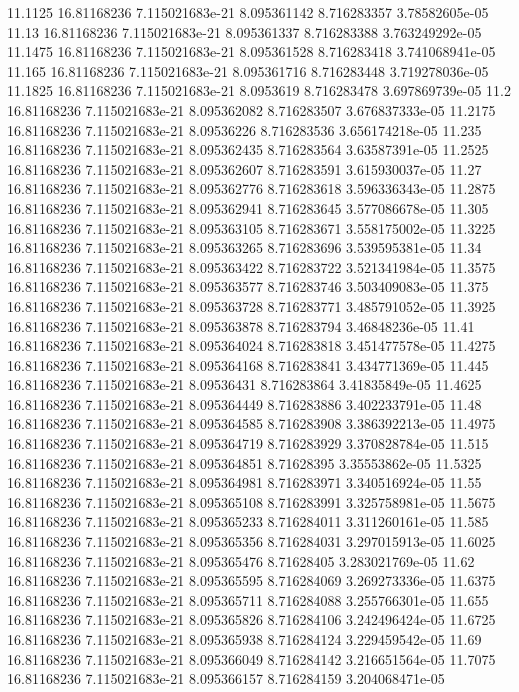{11.1125 16.81168236 7.115021683e-21 8.095361142 8.716283357 3.78582605e-05
11.13 16.81168236 7.115021683e-21 8.095361337 8.716283388 3.763249292e-05
11.1475 16.81168236 7.115021683e-21 8.095361528 8.716283418 3.741068941e-05
11.165 16.81168236 7.115021683e-21 8.095361716 8.716283448 3.719278036e-05
11.1825 16.81168236 7.115021683e-21 8.0953619 8.716283478 3.697869739e-05
11.2 16.81168236 7.115021683e-21 8.095362082 8.716283507 3.676837333e-05
11.2175 16.81168236 7.115021683e-21 8.09536226 8.716283536 3.656174218e-05
11.235 16.81168236 7.115021683e-21 8.095362435 8.716283564 3.63587391e-05
11.2525 16.81168236 7.115021683e-21 8.095362607 8.716283591 3.615930037e-05
11.27 16.81168236 7.115021683e-21 8.095362776 8.716283618 3.596336343e-05
11.2875 16.81168236 7.115021683e-21 8.095362941 8.716283645 3.577086678e-05
11.305 16.81168236 7.115021683e-21 8.095363105 8.716283671 3.558175002e-05
11.3225 16.81168236 7.115021683e-21 8.095363265 8.716283696 3.539595381e-05
11.34 16.81168236 7.115021683e-21 8.095363422 8.716283722 3.521341984e-05
11.3575 16.81168236 7.115021683e-21 8.095363577 8.716283746 3.503409083e-05
11.375 16.81168236 7.115021683e-21 8.095363728 8.716283771 3.485791052e-05
11.3925 16.81168236 7.115021683e-21 8.095363878 8.716283794 3.46848236e-05
11.41 16.81168236 7.115021683e-21 8.095364024 8.716283818 3.451477578e-05
11.4275 16.81168236 7.115021683e-21 8.095364168 8.716283841 3.434771369e-05
11.445 16.81168236 7.115021683e-21 8.09536431 8.716283864 3.41835849e-05
11.4625 16.81168236 7.115021683e-21 8.095364449 8.716283886 3.402233791e-05
11.48 16.81168236 7.115021683e-21 8.095364585 8.716283908 3.386392213e-05
11.4975 16.81168236 7.115021683e-21 8.095364719 8.716283929 3.370828784e-05
11.515 16.81168236 7.115021683e-21 8.095364851 8.71628395 3.35553862e-05
11.5325 16.81168236 7.115021683e-21 8.095364981 8.716283971 3.340516924e-05
11.55 16.81168236 7.115021683e-21 8.095365108 8.716283991 3.325758981e-05
11.5675 16.81168236 7.115021683e-21 8.095365233 8.716284011 3.311260161e-05
11.585 16.81168236 7.115021683e-21 8.095365356 8.716284031 3.297015913e-05
11.6025 16.81168236 7.115021683e-21 8.095365476 8.71628405 3.283021769e-05
11.62 16.81168236 7.115021683e-21 8.095365595 8.716284069 3.269273336e-05
11.6375 16.81168236 7.115021683e-21 8.095365711 8.716284088 3.255766301e-05
11.655 16.81168236 7.115021683e-21 8.095365826 8.716284106 3.242496424e-05
11.6725 16.81168236 7.115021683e-21 8.095365938 8.716284124 3.229459542e-05
11.69 16.81168236 7.115021683e-21 8.095366049 8.716284142 3.216651564e-05
11.7075 16.81168236 7.115021683e-21 8.095366157 8.716284159 3.204068471e-05
}
